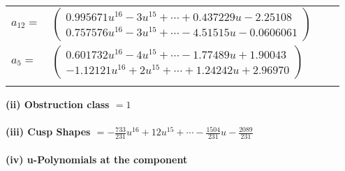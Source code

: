 \documentclass[1p]{elsarticle_modified}
\theoremstyle{definition}
\begin{document}
\begin{tabular}{m{7pt} m{180pt} m{7pt} m{180pt} }
\flushright $a_{12}=$&$\begin{pmatrix}0.995671 u^{16}-3 u^{15}+\cdots+0.437229 u-2.25108\\0.757576 u^{16}-3 u^{15}+\cdots-4.51515 u-0.0606061\end{pmatrix}$ \\
\flushright $a_{5}=$&$\begin{pmatrix}0.601732 u^{16}-4 u^{15}+\cdots-1.77489 u+1.90043\\-1.12121 u^{16}+2 u^{15}+\cdots+1.24242 u+2.96970\end{pmatrix}$\\&\end{tabular}
\flushleft \textbf{(ii) Obstruction class $= 1$}\\~\\
\flushleft \textbf{(iii) Cusp Shapes $= -\frac{733}{231} u^{16}+12 u^{15}+\cdots-\frac{1504}{231} u-\frac{2089}{231}$}\\~\\
\newpage\renewcommand{\arraystretch}{1}
\flushleft \textbf{(iv) u-Polynomials at the component}\newline \\
\end{document}
